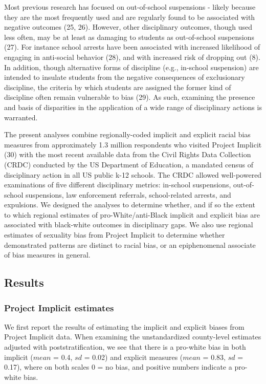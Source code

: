 \documentclass[9pt,twocolumn,twoside,lineno]{pnas-new}
\begin{document}
Most previous research has focused on out-of-school suspensions - likely
because they are the most frequently used and are regularly found to be
associated with negative outcomes (25, 26). However, other disciplinary
outcomes, though used less often, may be at least as damaging to
students as out-of-school suspensions (27). For instance school arrests
have been associated with increased likelihood of engaging in
anti-social behavior (28), and with increased risk of dropping out (8).
In addition, though alternative forms of discipline (e.g., in-school
suspension) are intended to insulate students from the negative
consequences of exclusionary discipline, the criteria by which students
are assigned the former kind of discipline often remain vulnerable to
bias (29). As such, examining the presence and basis of disparities in
the application of a wide range of disciplinary actions is warranted.

The present analyses combine regionally-coded implicit and explicit
racial bias measures from approximately 1.3 million respondents who
visited Project Implicit (30) with the most recent available data from
the Civil Rights Data Collection (CRDC) conducted by the US Department
of Education, a mandated census of disciplinary action in all US public
k-12 schools. The CRDC allowed well-powered examinations of five
different disciplinary metrics: in-school suspensions, out-of-school
suspensions, law enforcement referrals, school-related arrests, and
expulsions. We designed the analyses to determine whether, and if so the
extent to which regional estimates of pro-White/anti-Black implicit and
explicit bias are associated with black-white outcomes in disciplinary
gaps. We also use regional estimates of sexuality bias from Project
Implicit to determine whether demonstrated patterns are distinct to
racial bias, or an epiphenomenal associate of bias measures in general.

\subsection{Results}\label{results}

\subsubsection{Project Implicit
estimates}\label{project-implicit-estimates}

We first report the results of estimating the implicit and explicit
biases from Project Implicit data. When examining the unstandardized
county-level estimates adjusted with poststratification, we see that
there is a pro-white bias in both implicit (\(mean\) = 0.4, \(sd\) =
0.02) and explicit measures (\(mean\) = 0.83, \(sd\) = 0.17), where on
both scales 0 = no bias, and positive numbers indicate a pro-white bias.
\end{document}
